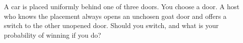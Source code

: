 A car is placed uniformly behind one of three doors. You choose a door. A host who knows the placement always opens an unchosen goat door and offers a switch to the other unopened door. Should you switch, and what is your probability of winning if you do?
